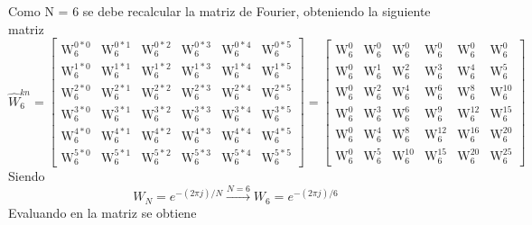 \documentclass[12pt]{article}
\begin{document}
Como N = 6 se debe recalcular la matriz de Fourier, obteniendo la siguiente matriz
$$
\hat{W}^{kn}_6 =
\begin{bmatrix}       
\text{W}_6^{0*0} & \text{W}_6^{0*1} & \text{W}_6^{0*2} & \text{W}_6^{0*3} & \text{W}_6^{0*4} & \text{W}_6^{0*5} \\
\text{W}_6^{1*0} & \text{W}_6^{1*1} & \text{W}_6^{1*2} & \text{W}_6^{1*3} & \text{W}_6^{1*4} & \text{W}_6^{1*5} \\
\text{W}_6^{2*0} & \text{W}_6^{2*1} & \text{W}_6^{2*2} & \text{W}_6^{2*3} & \text{W}_6^{2*4} & \text{W}_6^{2*5} \\
\text{W}_6^{3*0} & \text{W}_6^{3*1} & \text{W}_6^{3*2} & \text{W}_6^{3*3} & \text{W}_6^{3*4} & \text{W}_6^{3*5} \\
\text{W}_6^{4*0} & \text{W}_6^{4*1} & \text{W}_6^{4*2} & \text{W}_6^{4*3} & \text{W}_6^{4*4} & \text{W}_6^{4*5} \\
\text{W}_6^{5*0} & \text{W}_6^{5*1} & \text{W}_6^{5*2} & \text{W}_6^{5*3} & \text{W}_6^{5*4} & \text{W}_6^{5*5}
\end{bmatrix}
=
\begin{bmatrix}       
\text{W}_6^{0} & \text{W}_6^{0} & \text{W}_6^{0} & \text{W}_6^{0} & \text{W}_6^{0} & \text{W}_6^{0} \\
\text{W}_6^{0} & \text{W}_6^{1} & \text{W}_6^{2} & \text{W}_6^{3} & \text{W}_6^{4} & \text{W}_6^{5} \\
\text{W}_6^{0} & \text{W}_6^{2} & \text{W}_6^{4} & \text{W}_6^{6} & \text{W}_6^{8} & \text{W}_6^{10} \\
\text{W}_6^{0} & \text{W}_6^{3} & \text{W}_6^{6} & \text{W}_6^{9} & \text{W}_6^{12} & \text{W}_6^{15} \\
\text{W}_6^{0} & \text{W}_6^{4} & \text{W}_6^{8} & \text{W}_6^{12} & \text{W}_6^{16} & \text{W}_6^{20} \\
\text{W}_6^{0} & \text{W}_6^{5} & \text{W}_6^{10} & \text{W}_6^{15} & \text{W}_6^{20} & \text{W}_6^{25}
\end{bmatrix}
$$
Siendo 
$$
W_N = e^{-(2\pi j) / N} \xrightarrow{N=6} W_6 = e^{-(2\pi j) / 6}
$$
Evaluando en la matriz se obtiene

\end{document}
